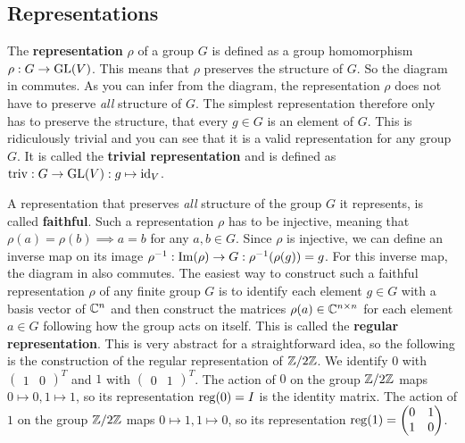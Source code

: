 \subsection{Representations}

The \textbf{representation} $\rho$ of a group $G$ is defined as a group homomorphism $\rho: G \to \operatorname{GL}(V)$.
This means that $\rho$ preserves the structure of $G$.
So the diagram in  commutes.
As you can infer from the diagram, the representation $\rho$ does not have to preserve \textit{all} structure of $G$.
The simplest representation therefore only has to preserve the structure, that every $g \in G$ is an element of $G$.
This is ridiculously trivial and you can see that it is a valid representation for any group $G$.
It is called the \textbf{trivial representation} and is defined as $\operatorname{triv}: G \to \operatorname{GL}(V): g \mapsto \operatorname{id}_V$.

A representation that preserves \textit{all} structure of the group $G$ it represents, is called \textbf{faithful}.
Such a representation $\rho$ has to be injective, meaning that $\rho(a) = \rho(b) \implies a = b$ for any $a, b \in G$.
Since $\rho$ is injective, we can define an inverse map on its image $\rho^{-1}: \operatorname{Im}(\rho) \to G: \rho^{-1}(\rho(g)) = g$.
For this inverse map, the diagram in  also commutes.
The easiest way to construct such a faithful representation $\rho$ of any finite group $G$ is to identify each element $g \in G$ with a basis vector of $\mathbb{C}^n$ and then construct the matrices $\rho(a) \in \mathbb{C}^{n \times n}$ for each element $a \in G$ following how the group acts on itself.
This is called the \textbf{regular representation}.
This is very abstract for a straightforward idea, so the following is the construction of the regular representation of $\mathbb{Z}/2\mathbb{Z}$.
We identify $0$ with $\begin{pmatrix}
    1 & 0
\end{pmatrix}^T$ and $1$ with $\begin{pmatrix}
    0 & 1
\end{pmatrix}^T$.
The action of $0$ on the group $\mathbb{Z}/2\mathbb{Z}$ maps $0 \mapsto 0, 1 \mapsto 1$, so its representation $\operatorname{reg}(0) = I$ is the identity matrix.
The action of $1$ on the group $\mathbb{Z}/2\mathbb{Z}$ maps $0 \mapsto 1, 1 \mapsto 0$, so its representation $\operatorname{reg}(1) = \begin{pmatrix}
    0 & 1 \\
    1 & 0
\end{pmatrix}$.

